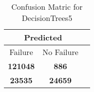 \begin{table}[] 
\caption{Confusion Matric for DecisionTrees5} 
\label{Table: Prediction Accuracy-DMDDecisionTrees5OnlySunEKF-resetReflectionEKF-top2perfectNoFailurePrediction-Reflection} 
\centering 
\begin{tabular} 
 {@{}ccc@{}} 
\toprule 
\multicolumn{2}{c}{\textbf{Predicted}}
 \\ \midrule 
\multicolumn{1}{|c|}{Failure} & 
\multicolumn{1}{c|}{No Failure}
 \\ \midrule 
\multicolumn{1}{|c|}{\color{green}\textbf{121048}} & 
\multicolumn{1}{c|}{\color{red}\textbf{886}}
 \\ \midrule 
\multicolumn{1}{|c|}{\color{red}\textbf{23535}} & 
\multicolumn{1}{c|}{\color{green}\textbf{24659}}
 \\ \bottomrule 
\end{tabular} 
\end{table} 
